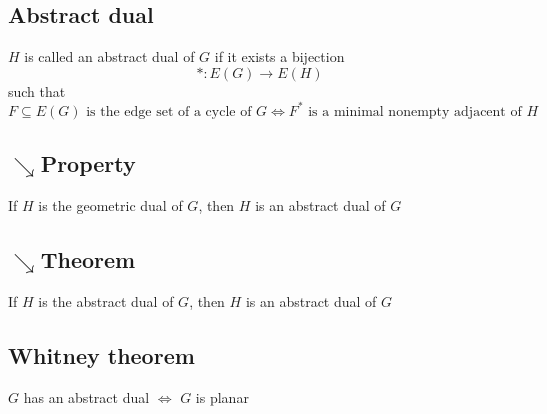         \subsection{Abstract dual}
            $H$ is called an abstract dual of $G$ if it exists a bijection
            \[*:E(G)\rightarrow E(H)\]
            such that 
            \[F\subseteq E(G)\text{ is the edge set of a cycle of }G\Leftrightarrow F^*\text{ is a minimal nonempty adjacent of }H\]
        \subsection{$\searrow$Property}
            If $H$ is the geometric dual of $G$, then $H$ is an abstract dual of $G$
        \subsection{$\searrow$Theorem}
            If $H$ is the abstract dual of $G$, then $H$ is an abstract dual of $G$
        \subsection{Whitney theorem}
            $G$ has an abstract dual $\Leftrightarrow$ $G$ is planar

